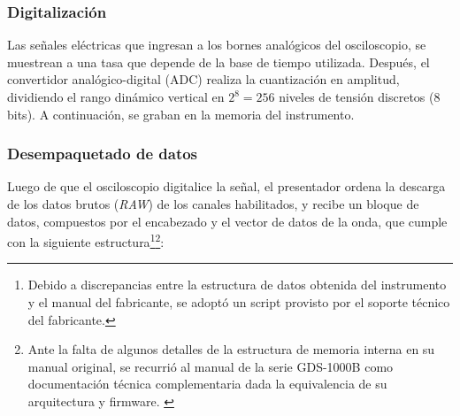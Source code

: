 \subsubsection{Digitalización}

Las señales eléctricas que ingresan a los bornes analógicos del osciloscopio, se muestrean a una tasa que depende de la base de tiempo utilizada. Después, el convertidor analógico-digital (ADC) realiza la cuantización en amplitud, dividiendo el rango dinámico vertical en $2^8 = 256$ niveles de tensión discretos (\num{8} bits). A continuación, se graban en la memoria del instrumento.

\subsubsection{Desempaquetado de datos}
\label{subsec:desempaquetado_datos}

Luego de que el osciloscopio digitalice la señal, el presentador ordena la descarga de los datos brutos (\emph{RAW}) de los canales habilitados, y recibe un bloque de datos, compuestos por el encabezado y el vector de datos de la onda, que cumple con la siguiente estructura\footnote{Debido a discrepancias entre la estructura de datos obtenida del instrumento y el manual del fabricante, se adoptó un script provisto por el soporte técnico del fabricante.}\footnote{Ante la falta de algunos detalles de la estructura de memoria interna en su manual original, se recurrió al manual de la serie GDS-1000B como documentación técnica complementaria dada la equivalencia de su arquitectura y firmware. \cite{gds1000b_ProgrammingManual}}:

